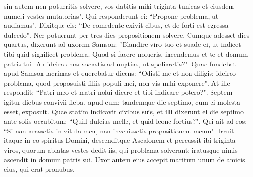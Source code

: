 \begin{biblechapter}
\verse sin autem non potueritis solvere, vos dabitis mihi triginta tunicas et eiusdem numeri vestes mutatorias". Qui responderunt ei: “Propone problema, ut audiamus". 
\verse Dixitque eis: “De comedente exivit cibus, et de forti est egressa dulcedo". Nec potuerunt per tres dies propositionem solvere. 
\verse Cumque adesset dies quartus, dixerunt ad uxorem Samson: “Blandire viro tuo et suade ei, ut indicet tibi quid significet problema. Quod si facere nolueris, incendemus et te et domum patris tui. An idcirco nos vocastis ad nuptias, ut spoliaretis?". 
\verse Quae fundebat apud Samson lacrimas et querebatur dicens: “Odisti me et non diligis; idcirco problema, quod proposuisti filiis populi mei, non vis mihi exponere". At ille respondit: “Patri meo et matri nolui dicere et tibi indicare potero?". 
\verse Septem igitur diebus convivii flebat apud eum; tandemque die septimo, cum ei molesta esset, exposuit. Quae statim indicavit civibus suis, 
\verse et illi dixerunt ei die septimo ante solis occubitum: “Quid dulcius melle, et quid leone fortius?". Qui ait ad eos: “Si non arassetis in vitula mea, non invenissetis propositionem meam". 
\verse Irruit itaque in eo spiritus Domini, descenditque Ascalonem et percussit ibi triginta viros, quorum ablatas vestes dedit iis, qui problema solverant; iratusque nimis ascendit in domum patris sui. 
\verse Uxor autem eius accepit maritum unum de amicis eius, qui erat pronubus. 
\end{biblechapter}

